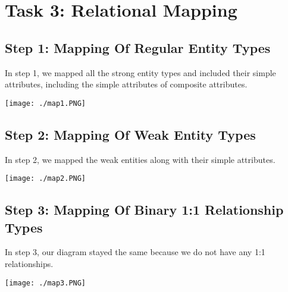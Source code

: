 \documentclass[titlepage]{article}
\begin{document}
\newpage


\section{Task 3: Relational Mapping}

\vspace{2em}

\subsection{Step 1: Mapping Of Regular Entity Types}
\vspace{1em}
\noindent
In step 1, we mapped all the strong entity types and included their simple attributes,
including the simple attributes of composite attributes. 
\vspace{1em}
\begin{center}
\texttt{[image: ./map1.PNG]}
\end{center}
\newpage

\subsection{Step 2: Mapping Of Weak Entity Types}
\vspace{1em}
\noindent
In step 2, we mapped the weak entities along with their simple attributes.
\vspace{1em}
\begin{center}
\texttt{[image: ./map2.PNG]}
\end{center}
\newpage


\subsection{Step 3: Mapping Of Binary 1:1 Relationship Types}
\vspace{1em}
\noindent
In step 3, our diagram stayed the same because we do not have any 1:1 relationships.
\vspace{1em}
\begin{center}
\texttt{[image: ./map3.PNG]}
\end{center}
\newpage
\end{document}
